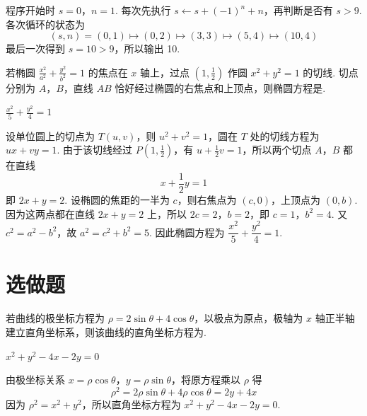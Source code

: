 \begin{solution}
程序开始时 \(s=0\)，\(n=1\). 每次先执行
\(s\leftarrow s+(-1)^n+n\)，再判断是否有 \(s>9\). 各次循环的状态为
\[
(s,n)=(0,1)\longmapsto(0,2)\longmapsto(3,3)\longmapsto(5,4)\longmapsto(10,4)
\]
最后一次得到 \(s=10>9\)，所以输出 10.
\end{solution}

\begin{problem}
若椭圆 \(\frac{x^2}{a^2} + \frac{y^2}{b^2} = 1\) 的焦点在 \(x\) 轴上，过点 \(\left(1, \frac{1}{2}\right)\) 作圆 \(x^2 + y^2 = 1\) 的切线. 切点分别为 \(A\)，\(B\)，直线 \(AB\) 恰好经过椭圆的右焦点和上顶点，则椭圆方程是\fillinblank{}.
\end{problem}

\begin{answer}
\(\frac{x^2}{5} + \frac{y^2}{4} = 1\)
\end{answer}

\begin{solution}
设单位圆上的切点为 \(T(u,v)\)，则 \(u^2+v^2=1\)，圆在 \(T\) 处的切线方程为 \(ux+vy=1\). 由于该切线经过 \(P\left(1,\frac{1}{2}\right)\)，有 \(u+\frac{1}{2}v=1\)，所以两个切点 \(A\)，\(B\) 都在直线
\[
x+\frac{1}{2}y=1
\]
即 \(2x+y=2\). 设椭圆的焦距的一半为 \(c\)，则右焦点为 \((c,0)\)，上顶点为 \((0,b)\). 因为这两点都在直线 \(2x+y=2\) 上，所以
\(2c=2\)，\(b=2\)，即 \(c=1\)，\(b^2=4\). 又
\(c^2=a^2-b^2\)，故 \(a^2=c^2+b^2=5\). 因此椭圆方程为
\(\dfrac{x^2}{5}+\dfrac{y^2}{4}=1\).
\end{solution}

\section{选做题}

\begin{problem}[A]
若曲线的极坐标方程为 \(\rho = 2 \sin \theta + 4 \cos \theta\)，以极点为原点，极轴为 \(x\) 轴正半轴建立直角坐标系，则该曲线的直角坐标方程为\fillinblank{}.
\end{problem}

\begin{answer}
\(x^2 + y^2 - 4x - 2y = 0\)
\end{answer}

\begin{solution}
由极坐标关系 \(x=\rho\cos\theta\)，\(y=\rho\sin\theta\)，将原方程乘以 \(\rho\) 得
\[
\rho^2=2\rho\sin\theta+4\rho\cos\theta=2y+4x
\]
因为 \(\rho^2=x^2+y^2\)，所以直角坐标方程为
\(x^2+y^2-4x-2y=0\).
\end{solution}

